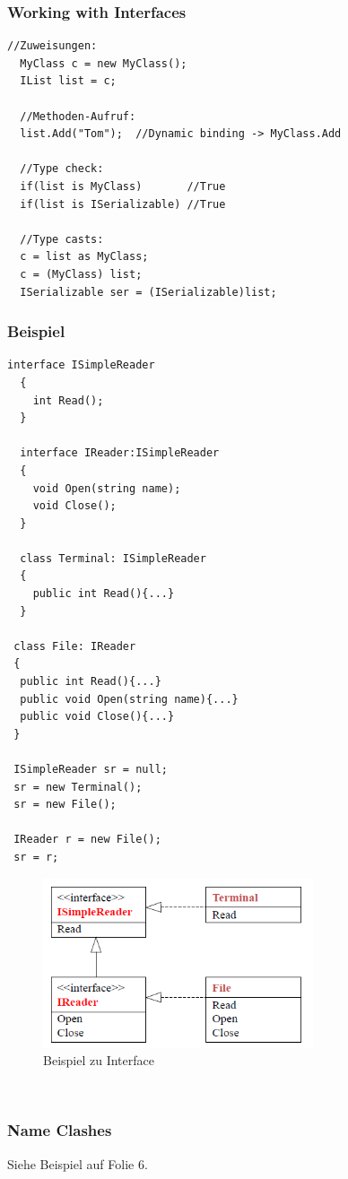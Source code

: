 \subsubsection{Working with Interfaces}
\begin{lstlisting}[style=C]
  //Zuweisungen: 
  MyClass c = new MyClass(); 
  IList list = c; 
  
  //Methoden-Aufruf:
  list.Add("Tom");  //Dynamic binding -> MyClass.Add
  
  //Type check:
  if(list is MyClass)       //True
  if(list is ISerializable) //True
  
  //Type casts: 
  c = list as MyClass; 
  c = (MyClass) list; 
  ISerializable ser = (ISerializable)list;
\end{lstlisting}

\subsubsection{Beispiel}
\begin{lstlisting}[style=C]
  interface ISimpleReader
  {
    int Read();  
  }
  
  interface IReader:ISimpleReader
  {
    void Open(string name); 
    void Close(); 
  }
  
  class Terminal: ISimpleReader
  {
    public int Read(){...}
  }
 
 class File: IReader
 {
  public int Read(){...}
  public void Open(string name){...}
  public void Close(){...}
 }
 
 ISimpleReader sr = null; 
 sr = new Terminal(); 
 sr = new File(); 
 
 IReader r = new File(); 
 sr = r; 
\end{lstlisting}
\begin{figure}[h]
  \centering
  \includegraphics[height=5cm, ]{images/CSharp/InterfaceExample}
  \caption{Beispiel zu Interface} 
\end{figure}\\

\subsubsection{Name Clashes}
Siehe Beispiel auf Folie 6. 